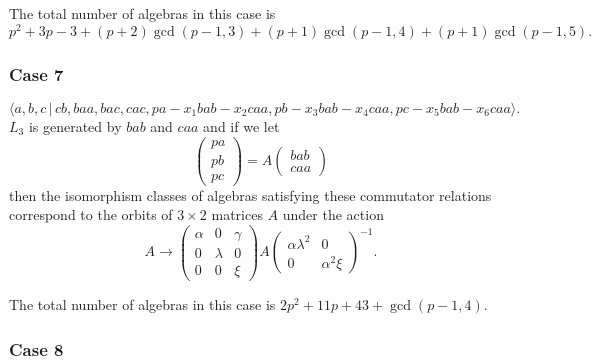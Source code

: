 \documentclass[10pt]{article}
\begin{document}
The total number of algebras in this case is 
\[
p^2+3p-3+(p+2)\gcd (p-1,3)+(p+1)\gcd (p-1,4)+(p+1)\gcd (p-1,5). 
\]

\subsubsection{Case 7}

\begin{equation}
\langle
a,b,c\,|%
\,cb,baa,bac,cac,pa-x_{1}bab-x_{2}caa,pb-x_{3}bab-x_{4}caa,pc-x_{5}bab-x_{6}caa\rangle .
\tag{7.763}
\end{equation}%
$L_{3}$ is generated by $bab$ and $caa$ and if we let 
\[
\left( 
\begin{array}{l}
pa \\ 
pb \\ 
pc%
\end{array}%
\right) =A\left( 
\begin{array}{l}
bab \\ 
caa%
\end{array}%
\right) 
\]%
then the isomorphism classes of algebras satisfying these commutator
relations correspond to the orbits of $3\times 2$ matrices $A$ under the
action 
\[
A\rightarrow \left( 
\begin{array}{lll}
\alpha & 0 & \gamma \\ 
0 & \lambda & 0 \\ 
0 & 0 & \xi%
\end{array}%
\right) A\left( 
\begin{array}{ll}
\alpha \lambda ^{2} & 0 \\ 
0 & \alpha ^{2}\xi%
\end{array}%
\right) ^{-1}. 
\]%
$\allowbreak $

The total number of algebras in this case is $2p^2+11p+43+\gcd (p-1,4)$.

\subsubsection{Case 8}
\end{document}
